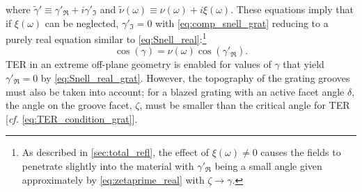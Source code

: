where $\tilde{\gamma}' \equiv \gamma'_{\Re} + i \gamma'_{\Im}$ and $\tilde{\nu} (\omega) \equiv \nu (\omega) + i \xi (\omega)$. 
These equations imply that if $\xi (\omega)$ can be neglected, $\gamma'_{\Im} = 0$ with \cref{eq:comp_snell_grat} reducing to a purely real equation similar to \cref{eq:Snell_real}:\footnote{As described in \cref{sec:total_refl}, the effect of $\xi (\omega) \neq 0$ causes the fields to penetrate slightly into the material with $\gamma'_{\Re}$ being a small angle given approximately by \cref{eq:zetaprime_real} with $\zeta \to \gamma$.}
\begin{equation}\label{eq:Snell_real_grat}
 \cos \left( \gamma \right) = \nu (\omega) \cos \left( \gamma'_{\Re} \right) .
 \end{equation}
TER in an extreme off-plane geometry is enabled for values of $\gamma$ that yield $\gamma'_{\Re} = 0$ by \cref{eq:Snell_real_grat}. 
However, the topography of the grating grooves must also be taken into account; for a blazed grating with an active facet angle $\delta$, the angle on the groove facet, $\zeta$, must be smaller than the critical angle for TER [\emph{cf.\@} \cref{eq:TER_condition_grat}]. 

